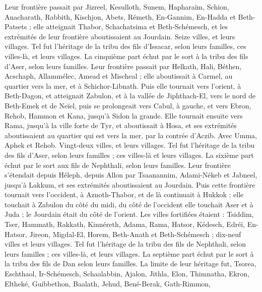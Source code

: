\begin{multicols}{2}
Leur frontière passait par Jizreel, Kesulloth, Sunem,
Hapharaïm, Schion, Anacharath,
Rabbith, Kischjon, Abets,
Rémeth, En-Gannim, En-Hadda et Beth-Patsets ;
elle atteignait Thabor, Schachatsima et Beth-Schémesch, et les extrémités de leur frontière aboutissaient au Jourdain. Seize villes, et leurs villages.
Tel fut l’héritage de la tribu des fils d’Issacar, selon leurs familles, ces villes-là, et leurs villages.
La cinquième part échut par le sort à la tribu des fils d’Aser, selon leurs familles.
Leur frontière passait par Helkath, Hali, Béthen, Acschaph,
Allammélec, Amead et Mischeal ; elle aboutissait à Carmel, au quartier vers la mer, et à Schichor-Libnath.
Puis elle tournait vers l’orient, à Beth-Dagon, et atteignait Zabulon, et à la vallée de Jiphthach-El, vers le nord de Beth-Emek et de Neïel, puis se prolongeait vers Cabul, à gauche,
et vers Ebron, Rehob, Hammon et Kana, jusqu’à Sidon la grande.
Elle tournait ensuite vers Rama, jusqu’à la ville forte de Tyr, et aboutissait à Hosa, et ses extrémités aboutissaient au quartier qui est vers la mer, par la contrée d’Aczib.
Avec Umma, Aphek et Rehob. Vingt-deux villes, et leurs villages.
Tel fut l’héritage de la tribu des fils d’Aser, selon leurs familles ; ces villes-là et leurs villages.
La sixième part échut par le sort aux fils de Nephthali, selon leurs familles.
Leur frontière s’étendait depuis Héleph, depuis Allon par Tsaanannim, Adami-Nékeb et Jabneel, jusqu’à Lakkum, et ses extrémités aboutissaient au Jourdain.
Puis cette frontière tournait vers l’occident, à Aznoth-Thabor, et de là continuait à Hukkok ; elle touchait à Zabulon du côté du midi, du côté de l’occident elle touchait Aser et à Juda ; le Jourdain était du côté de l’orient.
Les villes fortifiées étaient : Tsiddim, Tser, Hammath, Rakkath, Kinnéreth,
Adama, Rama, Hatsor,
Kédesch, Edréï, En-Hatsor,
Jireon, Migdal-El, Horem, Beth-Anath et Beth-Schémesch ; dix-neuf villes et leurs villages.
Tel fut l’héritage de la tribu des fils de Nephthali, selon leurs familles ; ces villes-là, et leurs villages.
La septième part échut par le sort à la tribu des fils de Dan selon leurs familles.
La limite de leur héritage fut, Tsorea, Eschthaol, Ir-Schémesch,
Schaalabbin, Ajalon, Jithla,
Elon, Thimnatha, Ekron,
Eltheké, Guibbethon, Baalath,
Jehud, Bené-Berak, Gath-Rimmon,

\end{multicols}
